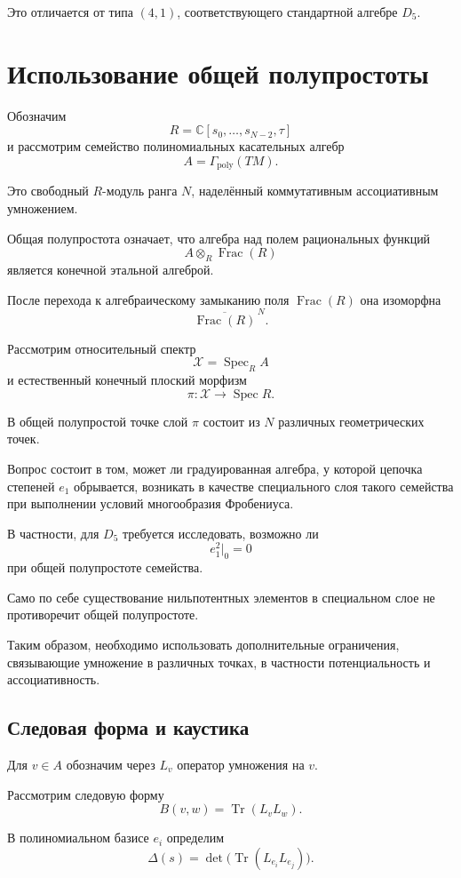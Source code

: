 Это отличается от типа $(4,1)$,
соответствующего стандартной алгебре $D_5$.


\section{Использование общей полупростоты}

Обозначим
\[
R=\mathbb C[s_0,\ldots,s_{N-2},\tau]
\]
и рассмотрим семейство полиномиальных
касательных алгебр
\[
A=\Gamma_{\mathrm{poly}}(TM).
\]

Это свободный $R$-модуль ранга $N$,
наделённый коммутативным ассоциативным
умножением.

Общая полупростота означает, что
алгебра над полем рациональных функций
\[
A\otimes_R\operatorname{Frac}(R)
\]
является конечной этальной алгеброй.

После перехода к алгебраическому замыканию
поля $\operatorname{Frac}(R)$ она изоморфна
\[
\overline{\operatorname{Frac}(R)}^{\,N}.
\]

Рассмотрим относительный спектр
\[
\mathcal X=\operatorname{Spec}_R A
\]
и естественный конечный плоский морфизм
\[
\pi:\mathcal X\longrightarrow
\operatorname{Spec}R.
\]

В общей полупростой точке слой $\pi$
состоит из $N$ различных геометрических точек.

Вопрос состоит в том, может ли градуированная
алгебра, у которой цепочка степеней $e_1$
обрывается, возникать в качестве специального
слоя такого семейства при выполнении
условий многообразия Фробениуса.

В частности, для $D_5$ требуется исследовать,
возможно ли
\[
e_1^2\big|_0=0
\]
при общей полупростоте семейства.

Само по себе существование нильпотентных
элементов в специальном слое не противоречит
общей полупростоте.

Таким образом, необходимо использовать
дополнительные ограничения, связывающие
умножение в различных точках, в частности
потенциальность и ассоциативность.

\subsection{Следовая форма и каустика}

Для $v\in A$ обозначим через $L_v$
оператор умножения на $v$.

Рассмотрим следовую форму
\[
B(v,w)=\operatorname{Tr}(L_vL_w).
\]

В полиномиальном базисе $e_i$
определим
\[
\Delta(s)=
\det\bigl(
\operatorname{Tr}(L_{e_i}L_{e_j})
\bigr).
\]

